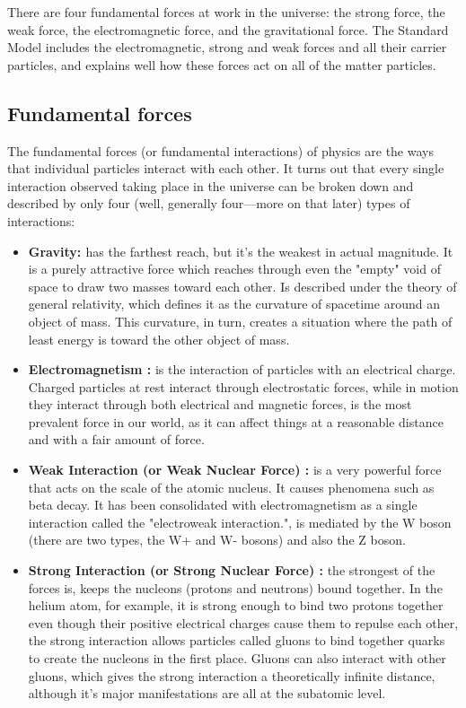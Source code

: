 There are four fundamental forces at work in the universe: the strong force, the weak force, the electromagnetic force, and the gravitational force. The Standard Model includes the electromagnetic, strong and weak forces and all their carrier particles, and explains well how these forces act on all of the matter particles.

\subsection{Fundamental forces}

The fundamental forces (or fundamental interactions) of physics are the ways that individual particles interact with each other. It turns out that every single interaction observed taking place in the universe can be broken down and described by only four (well, generally four—more on that later) types of interactions:

\begin{itemize}
    \item \textbf{\textcolor{azul50}{Gravity: }} has the farthest reach, but it's the weakest in actual magnitude. It is a purely attractive force which reaches through even the "empty" void of space to draw two masses toward each other. Is described under the theory of general relativity, which defines it as the curvature of spacetime around an object of mass. This curvature, in turn, creates a situation where the path of least energy is toward the other object of mass.
    \item \textbf{\textcolor{azul50}{Electromagnetism :}} is the interaction of particles with an electrical charge. Charged particles at rest interact through electrostatic forces, while in motion they interact through both electrical and magnetic forces, is the most prevalent force in our world, as it can affect things at a reasonable distance and with a fair amount of force.
    \item \textbf{\textcolor{azul50}{Weak Interaction (or Weak Nuclear Force) :}} is a very powerful force that acts on the scale of the atomic nucleus. It causes phenomena such as beta decay. It has been consolidated with electromagnetism as a single interaction called the "electroweak interaction.", is mediated by the W boson (there are two types, the W+ and W- bosons) and also the Z boson.
    \item \textbf{\textcolor{azul50}{Strong Interaction (or Strong Nuclear Force) :}} the strongest of the forces is, keeps the nucleons (protons and neutrons) bound together. In the helium atom, for example, it is strong enough to bind two protons together even though their positive electrical charges cause them to repulse each other, the strong interaction allows particles called gluons to bind together quarks to create the nucleons in the first place. Gluons can also interact with other gluons, which gives the strong interaction a theoretically infinite distance, although it's major manifestations are all at the subatomic level.
\end{itemize}


